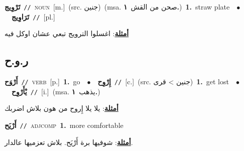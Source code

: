 \documentclass[10pt,a4paper,twoside]{article} %
\begin{document}
\begin{multicols}{2}
{\setlength\topsep{0pt}\textbf{\foreignlanguage{arabic}{تَرْوِيج}}\ {\color{gray}\texttt{//}\color{black}}\ \textsc{noun}\ [m.]\ (src. \color{gray}\foreignlanguage{arabic}{جنين}\color{black})\ \color{gray}(msa. \foreignlanguage{arabic}{صحن من القش}~\foreignlanguage{arabic}{\textbf{١.}})\color{black}\ \textbf{1.}~straw plate\ \ $\bullet$\ \ \setlength\topsep{0pt}\textbf{\foreignlanguage{arabic}{تَرَاوِيج}}\ {\color{gray}\texttt{//}\color{black}}\ [pl.]\  \begin{flushright}\color{gray}\foreignlanguage{arabic}{\textbf{\underline{\foreignlanguage{arabic}{أمثلة}}}: اغسلوا الترويج تبعي عشان اوكل فيه}\end{flushright}\color{black}} \vspace{2mm}

\vspace{-3mm}
\subsection*{\color{blue}\foreignlanguage{arabic}{ر.و.ح}\color{blue}{}} 

{\setlength\topsep{0pt}\textbf{\foreignlanguage{arabic}{أَرْوَح}}\ {\color{gray}\texttt{//}\color{black}}\ \textsc{verb}\ [p.]\ \textbf{1.}~go\ \ $\bullet$\ \ \setlength\topsep{0pt}\textbf{\foreignlanguage{arabic}{إِرْوِح}}\ {\color{gray}\texttt{//}\color{black}}\ [c.]\ (src. \color{gray}\foreignlanguage{arabic}{جنين > قرى}\color{black})\ \textbf{1.}~get lost\ \ $\bullet$\ \ \setlength\topsep{0pt}\textbf{\foreignlanguage{arabic}{يْأَرْوِح}}\ {\color{gray}\texttt{//}\color{black}}\ [i.]\ \color{gray}(msa. \foreignlanguage{arabic}{يذهب}~\foreignlanguage{arabic}{\textbf{١.}})\color{black}\  \begin{flushright}\color{gray}\foreignlanguage{arabic}{\textbf{\underline{\foreignlanguage{arabic}{أمثلة}}}: يلا يلا إِروح من هون بلاش اضربك}\end{flushright}\color{black}} \vspace{2mm}

{\setlength\topsep{0pt}\textbf{\foreignlanguage{arabic}{أَرْيَح}}\ {\color{gray}\texttt{//}\color{black}}\ \textsc{adj\textunderscore comp}\ \textbf{1.}~more comfortable\  \begin{flushright}\color{gray}\foreignlanguage{arabic}{\textbf{\underline{\foreignlanguage{arabic}{أمثلة}}}: شوفيها برة أَرْيَح. بلاش تعزميها عالدار.}\end{flushright}\color{black}} \vspace{2mm}


\end{multicols}
\end{document}
